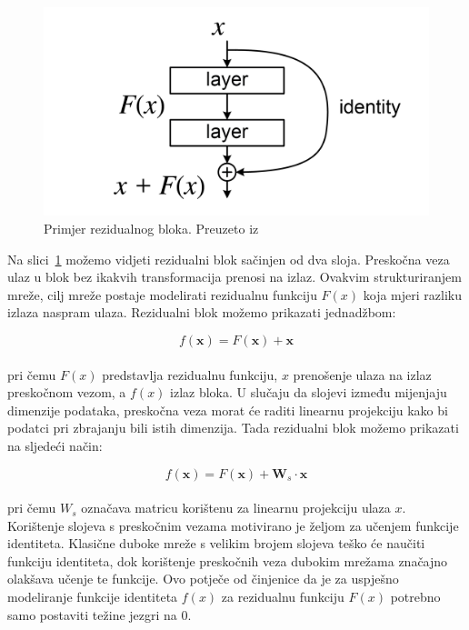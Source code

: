 \documentclass[times, utf8, zavrsni, numeric]{fer}
\begin{document}
\begin{figure}[htb]
    \centering
    \includegraphics{ResBlock.png}
    \caption{Primjer rezidualnog bloka. Preuzeto iz \cite{he2016deep}}
    \label{fig:resblock}
\end{figure}

Na slici~\ref{fig:resblock} možemo vidjeti rezidualni blok sačinjen od dva sloja. Preskočna veza ulaz u blok bez ikakvih transformacija prenosi na izlaz. 
Ovakvim strukturiranjem mreže, cilj mreže postaje modelirati rezidualnu funkciju $F(x)$ koja mjeri razliku izlaza naspram ulaza. Rezidualni blok možemo prikazati jednadžbom:

\begin{equation}
    f(\pmb{x}) = F(\pmb{x}) + \pmb{x}
    \label{eq:resblock}
\end{equation}
\\
pri čemu $F(x)$ predstavlja rezidualnu funkciju, $x$ prenošenje ulaza na izlaz preskočnom vezom, a $f(x)$ izlaz bloka. 
U slučaju da slojevi između mijenjaju dimenzije podataka, preskočna veza morat će raditi linearnu projekciju kako bi podatci pri zbrajanju bili istih dimenzija. 
Tada rezidualni blok možemo prikazati na sljedeći način:

\begin{equation}
    f(\pmb{x}) = F(\pmb{x}) + \pmb{W}_{s} \cdot \pmb{x}
    \label{eq:resblocklp}
\end{equation}
\\
pri čemu $W_{s}$ označava matricu korištenu za linearnu projekciju ulaza $x$. 
Korištenje slojeva s preskočnim vezama motivirano je željom za učenjem funkcije identiteta.
Klasične duboke mreže s velikim brojem slojeva teško će naučiti funkciju identiteta, dok korištenje preskočnih veza dubokim mrežama značajno olakšava učenje te funkcije.
Ovo potječe od činjenice da je za uspješno modeliranje funkcije identiteta $f(x)$ za rezidualnu funkciju $F(x)$ potrebno samo postaviti težine jezgri na 0.
\end{document}
